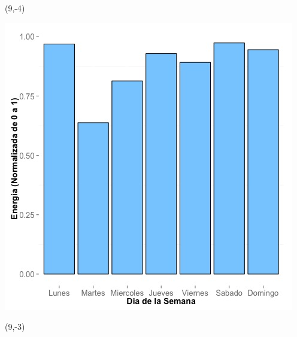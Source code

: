 \documentclass{article}\usepackage[]{graphicx}\usepackage[]{color}
\newenvironment{knitrout}{}{} %
\begin{document}
 \begin{textblock}{1}(9,-4)
\begin{minipage}{20em}
\begingroup

\endgroup
\end{minipage}
\end{textblock}


\begin{knitrout}
\color{fgcolor}
\includegraphics[scale=0.65]{figure/A4_day_of_week_plot} 
\end{knitrout}


 \begin{textblock}{1}(9,-3)
\begin{minipage}{20em}
\begingroup

\endgroup
\end{minipage}
\end{textblock}
\end{document}
